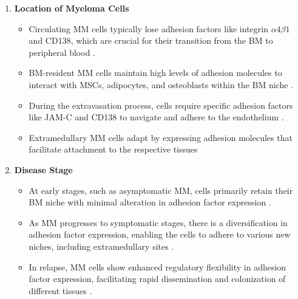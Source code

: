 \begin{enumerate}
    \item \textbf{Location of Myeloma Cells}
          \begin{itemize}
              \item Circulating MM cells typically lose adhesion factors like
                    integrin $\alpha4\beta1$ and CD138, which are crucial for their
                    transition from the BM to peripheral blood
                    \cite{zeissigTumourDisseminationMultiple2020, akhmetzyanovaDynamicCD138Surface2020}.
              \item BM-resident MM cells maintain high levels of adhesion
                    molecules to interact with MSCs, adipocytes, and osteoblasts
                    within the BM niche
                    \cite{bouzerdanAdhesionMoleculesMultiple2022, burgerGp130RasMediated2001, chatterjeePresenceBoneMarrow2002}.
              \item During the extravasation process, cells require specific
                    adhesion factors like JAM-C and CD138 to navigate and adhere to
                    the endothelium \cite{asosinghUniquePathwayHoming2001a, brandlJunctionalAdhesionMolecule2022}.
              \item Extramedullary MM cells adapt by expressing adhesion
                    molecules that facilitate attachment to the respective tissues
          \end{itemize}

    \item \textbf{Disease Stage}
          \begin{itemize}
              \item At early stages, such as asymptomatic MM, cells primarily
                    retain their BM niche with minimal alteration in adhesion factor
                    expression \cite{abdallahModeProgressionSmoldering2024, akhmetzyanovaDynamicCD138Surface2020}.
              \item As MM progresses to symptomatic stages, there is a
                    diversification in adhesion factor expression, enabling the cells
                    to adhere to various new niches, including extramedullary sites
                    \cite{asosinghUniquePathwayHoming2001a, akhmetzyanovaDynamicCD138Surface2020, dotterweichContactMyelomaCells2016}.
              \item In relapse, MM cells show enhanced regulatory flexibility in
                    adhesion factor expression, facilitating rapid dissemination and
                    colonization of different tissues
                    \cite{keatsClonalCompetitionAlternating2012, bobinRecentAdvancesTreatment2022}.
          \end{itemize}


\end{enumerate}

